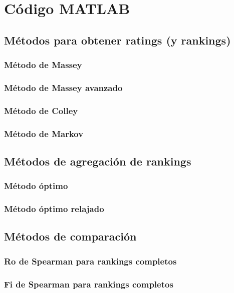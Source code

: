 \chapter{Código MATLAB}

\section{Métodos para obtener ratings (y rankings)}

\subsection*{Método de Massey}



\subsection*{Método de Massey avanzado}

\subsection*{Método de Colley}



\subsection*{Método de Markov}



\section{Métodos de agregación de rankings}

\subsection*{Método óptimo}



\subsection*{Método óptimo relajado}



\section{Métodos de comparación}

\subsection*{Ro de Spearman para rankings completos}



\subsection*{Fi de Spearman para rankings completos}


